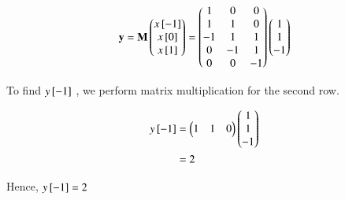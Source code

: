 \documentclass[journal]{IEEEtran}
\numberwithin{equation}{enumi}
\numberwithin{figure}{enumi}
\begin{document}
\begin{align}
    \mathbf{y} = \mathbf{M}\begin{pmatrix}x{}\left[-1\right]\\x{}\left[0\right]\\x{}\left[1\right]\end{pmatrix} = \begin{pmatrix}1&0&0\\1&1&0\\-1&1&1\\0&-1&1\\0&0&-1\end{pmatrix}\begin{pmatrix}1\\1\\-1\end{pmatrix}
\end{align}

To find $y{}\left[-1\right]$ , we perform matrix multiplication for the second row.

\begin{align}
    y{}\left[-1\right] &= \begin{pmatrix}1&1&0\end{pmatrix}\begin{pmatrix}1\\1\\-1\end{pmatrix}\\
    &=2
\end{align}

Hence, $y{}\left[-1\right]= 2$
\end{document}
